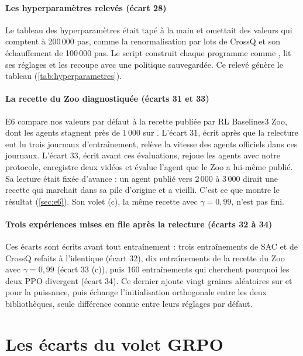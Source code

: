 \paragraph{Les hyperparamètres relevés (écart 28)} Le tableau des hyperparamètres était tapé à la
main et omettait des valeurs qui comptent à 200\,000 pas, comme la renormalisation par lots de
CrossQ et son échauffement de 100\,000 pas. Le script  construit
chaque programme comme , lit ses réglages et les recoupe avec une politique sauvegardée.
Ce relevé génère le tableau (\cref{tab:hyperparametres}).

\paragraph{La recette du Zoo diagnostiquée (écarts 31 et 33)} E6 compare nos valeurs par défaut à la
recette publiée par RL Baselines3 Zoo, dont les agents stagnent près de 1\,000 sur .
L'écart 31, écrit après que la relecture eut lu trois journaux d'entraînement, relève la vitesse des
agents officiels dans ces journaux. L'écart 33, écrit avant ces évaluations, rejoue les agents
avec notre protocole, enregistre deux vidéos et évalue l'agent que le Zoo a lui-même publié. Sa
lecture était fixée d'avance : un agent publié vers 2\,000 à 3\,000 dirait une recette qui marchait
dans sa pile d'origine et a vieilli. C'est ce que montre le résultat (\cref{sec:e6}). Son volet (c),
la même recette avec $\gamma = 0{,}99$, n'est pas fini.

\paragraph{Trois expériences mises en file après la relecture (écarts 32 à 34)} Ces écarts sont écrits
avant tout entraînement : trois entraînements de SAC et de CrossQ refaits à l'identique (écart 32), dix
entraînements de la recette du Zoo avec $\gamma = 0{,}99$ (écart 33 (c)), puis 160 entraînements
qui cherchent pourquoi les deux PPO divergent (écart 34). Ce dernier ajoute vingt graines
aléatoires sur  et  pour la puissance, puis échange l'initialisation
orthogonale entre les deux bibliothèques, seule différence connue entre leurs réglages par défaut.

\section{Les écarts du volet GRPO}
\label{sec:ecarts-llm}

